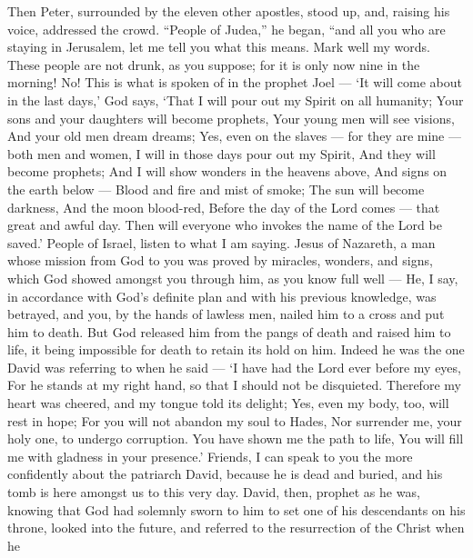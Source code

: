  Then Peter, surrounded by the eleven other apostles, stood
up, and, raising his voice, addressed the crowd. ``People of Judea,'' he
began, ``and all you who are staying in Jerusalem, let me tell you what
this means. Mark well my words.  These people are not
drunk, as you suppose; for it is only now nine in the morning! No!
 This is what is spoken of in the prophet Joel ---
 `It will come about in the last days,' God says, `That I
will pour out my Spirit on all humanity; Your sons and your daughters
will become prophets, Your young men will see visions, And your old men
dream dreams;  Yes, even on the slaves --- for they are
mine --- both men and women, I will in those days pour out my Spirit,
And they will become prophets;  And I will show wonders in
the heavens above, And signs on the earth below --- Blood and fire and
mist of smoke;  The sun will become darkness, And the moon
blood-red, Before the day of the Lord comes --- that great and awful
day.  Then will everyone who invokes the name of the Lord
be saved.'  People of Israel, listen to what I am saying.
Jesus of Nazareth, a man whose mission from God to you was proved by
miracles, wonders, and signs, which God showed amongst you through him,
as you know full well ---  He, I say, in accordance with
God's definite plan and with his previous knowledge, was betrayed, and
you, by the hands of lawless men, nailed him to a cross and put him to
death.  But God released him from the pangs of death and
raised him to life, it being impossible for death to retain its hold on
him.  Indeed he was the one David was referring to when he
said --- `I have had the Lord ever before my eyes, For he stands at my
right hand, so that I should not be disquieted.  Therefore
my heart was cheered, and my tongue told its delight; Yes, even my body,
too, will rest in hope;  For you will not abandon my soul
to Hades, Nor surrender me, your holy one, to undergo corruption.
 You have shown me the path to life, You will fill me with
gladness in your presence.'  Friends, I can speak to you
the more confidently about the patriarch David, because he is dead and
buried, and his tomb is here amongst us to this very day. 
David, then, prophet as he was, knowing that God had solemnly sworn to
him to set one of his descendants on his throne, looked into the future,
 and referred to the resurrection of the Christ when he
